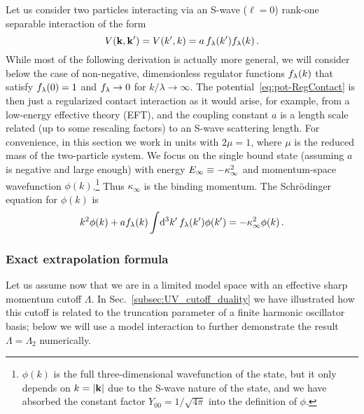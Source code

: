 	Let us consider two particles interacting via an S-wave ($\ell=0$) rank-one
	separable interaction of the form
	\begin{equation}
	 V(\mathbf{k},\mathbf{k}') = V(k',k) = a\,f_{\lambda}(k') f_{\lambda}(k) \,.
	\label{eq:pot-RegContact}
	\end{equation}
	While most of the following derivation is actually more general, we
	will consider below the case of non-negative, dimensionless regulator
	functions $f_{\lambda}(k)$ that satisfy $f_{\lambda}(0)=1$ and $f_{\lambda}\to 0$ for
	$k/\lambda\to\infty$.  The potential~\eqref{eq:pot-RegContact} is then
	just a regularized contact interaction as it would arise, for example,
	from a low-energy effective theory (EFT), and the coupling constant
	$a$ is a length scale related (up to some rescaling factors) to an
	S-wave scattering length.  For convenience, in this section we work in
	units with $2\mu=1$, where $\mu$ is the reduced mass of the
	two-particle system.  We focus on the single bound state (assuming $a$
	is negative and large enough) with energy $E_{\infty} \equiv -\kappa_{\infty}^2$
	and momentum-space wavefunction $\phi(k)$.\footnote{$\phi(k)$ is the
  full three-dimensional wavefunction of the state, but it only
  depends on $k=|\mathbf{k}|$ due to the S-wave nature of the state, and we
  have absorbed the constant factor $Y_{00}=1/\sqrt{4\pi}$ into the
  definition of $\phi$.}  Thus $\kappa_\infty$ is the binding
	momentum.  The Schr{\"o}dinger equation for $\phi(k)$ is
	\begin{equation}
	 k^2 \phi(k) + a  f_{\lambda}(k) \int\! \mathrm{d}^3k'\, f_{\lambda}(k')\phi(k')
	 = -\kappa_\infty^2 \phi(k) \,.
	\label{eq:haminfty}
	\end{equation}

	\subsubsection{Exact extrapolation formula}

	Let us assume now that we are in a limited model space with an
	effective sharp momentum cutoff $\Lambda$.  In
	Sec.~\ref{subsec:UV_cutoff_duality}
	we have illustrated how this cutoff is related to the truncation
	parameter of a finite harmonic oscillator basis; below we will use a
	model interaction to further demonstrate the result
	$\Lambda=\Lambda_2$ numerically.

